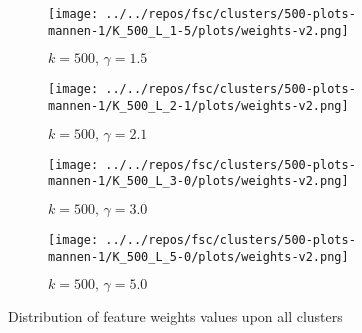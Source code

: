 \documentclass[../report.tex]{subfiles}
\begin{document}
\begin{figure}[!h]
         \centering
     \begin{subfigure}{0.45\textwidth}
         \centering
         \texttt{[image: ../../repos/fsc/clusters/500-plots-mannen-1/K\_500\_L\_1-5/plots/weights-v2.png]}
         \caption{$k=500 \text{, } \gamma=1.5$}
     \end{subfigure}
     \hfill
     \begin{subfigure}{0.45\textwidth}
         \centering
         \texttt{[image: ../../repos/fsc/clusters/500-plots-mannen-1/K\_500\_L\_2-1/plots/weights-v2.png]}
         \caption{$k=500 \text{, } \gamma=2.1$}
     \end{subfigure}
     \hfill
     \centering
     \begin{subfigure}{0.45\textwidth}
         \centering
         \texttt{[image: ../../repos/fsc/clusters/500-plots-mannen-1/K\_500\_L\_3-0/plots/weights-v2.png]}
         \caption{$k=500 \text{, } \gamma=3.0$}
     \end{subfigure}
     \hfill
     \centering
     \begin{subfigure}{0.45\textwidth}
         \centering
         \texttt{[image: ../../repos/fsc/clusters/500-plots-mannen-1/K\_500\_L\_5-0/plots/weights-v2.png]}
         \caption{$k=500 \text{, } \gamma=5.0$}
     \end{subfigure}
     \caption{Distribution of feature weights values upon all clusters}
     \label{fig:fsc-distribution}
\end{figure}
\end{document}
